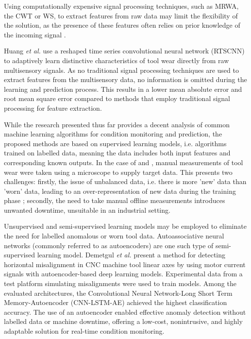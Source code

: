 \documentclass[../main.tex]{subfiles}
\begin{document}
Using computationally expensive signal processing techniques, such as MRWA, the CWT or WS, to extract features from raw data may limit the flexibility of the solution, as the presence of these features often relies on prior knowledge of the incoming signal \cite{RN24}.

Huang \textit{et al.} \cite{RN17} use a reshaped time series convolutional neural network (RTSCNN) to adaptively learn distinctive characteristics of tool wear directly from raw multisensory signals. As no traditional signal processing techniques are used to extract features from the multisensory data, no information is omitted during the learning and prediction process. This results in a lower mean absolute error and root mean square error compared to methods that employ traditional signal processing for feature extraction.

While the research presented thus far provides a decent analysis of common machine learning algorithms for condition monitoring and prediction, the proposed methods are based on supervised learning models, i.e. algorithms trained on labelled data, meaning the data includes both input features and corresponding known outputs. In the case of \cite{RN17} and \cite{RN13}, manual measurements of tool wear were taken using a microscope to supply target data. This presents two challenges: firstly, the issue of unbalanced data, i.e. there is more 'new' data than 'worn' data, leading to an over-representation of new data during the training phase \cite{RN6}; secondly, the need to take manual offline measurements introduces unwanted downtime, unsuitable in an industrial setting.


Unsupervised and semi-supervised learning models may be employed to eliminate the need for labelled anomalous or worn tool data. Autoassociative neural networks (commonly referred to as autoencoders) are one such type of semi-supervised learning model. Demetgul \textit{et al.} \cite{RN27} present a method for detecting horizontal misalignment in CNC machine tool linear axes by using motor current signals with autoencoder-based deep learning models. Experimental data from a test platform simulating misalignments were used to train models. Among the evaluated architectures, the Convolutional Neural Network-Long Short Term Memory-Autoencoder (CNN-LSTM-AE) achieved the highest classification accuracy. The use of an autoencoder enabled effective anomaly detection without labelled data or machine downtime, offering a low-cost, nonintrusive, and highly adaptable solution for real-time condition monitoring. 
\end{document}
